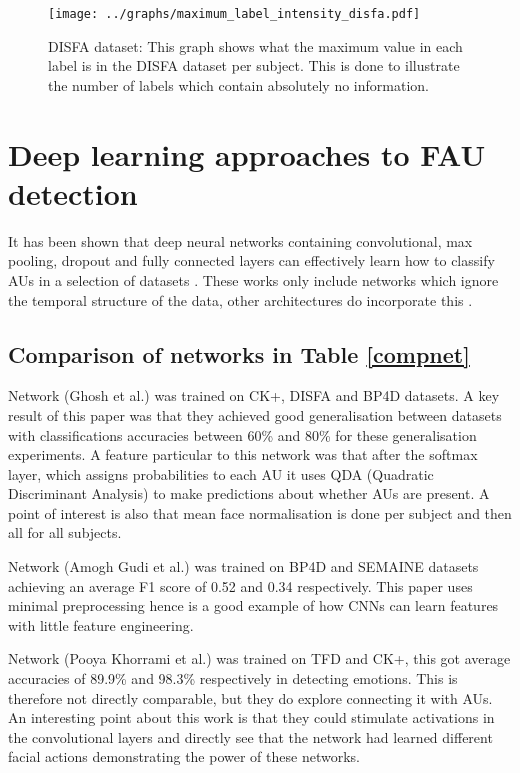 \documentclass[11pt,twoside]{report}
\begin{document}
\begin{figure}[h!]
  \texttt{[image: ../graphs/maximum\_label\_intensity\_disfa.pdf]}
  \caption{DISFA dataset: This graph shows what the maximum value in each label is in the DISFA dataset per subject. This
  is done to illustrate the number of labels which contain absolutely no information.}\label{disfastats}
\end{figure}
\newpage

\section{Deep learning approaches to FAU detection}
It has been shown that deep neural networks containing convolutional, max pooling,
dropout and fully connected layers can effectively learn how to classify AUs in
a selection of datasets \cite{Gudi2015,Ghosh2015,dodeeplearn}. These
works only include networks which ignore the temporal structure of the data,
other architectures do incorporate this \cite{emonet,Jaiswal2016}.


%
%
%






\subsection*{Comparison of networks in Table \ref{compnet}}
Network \cite{Ghosh2015} (Ghosh et al.) was trained on CK+, DISFA and BP4D datasets.
A key result of this paper was that they achieved good generalisation between datasets
with classifications accuracies between 60\% and 80\% for these generalisation experiments.
A feature particular to this network was that after the softmax layer, which assigns probabilities
to each AU it uses QDA (Quadratic Discriminant Analysis) \cite{precogbook} to
make predictions about whether AUs are present. A point of interest is also that
mean face normalisation is done per subject and then all for all subjects.

Network \cite{Gudi2015} (Amogh Gudi et al.) was trained on BP4D and SEMAINE
datasets achieving an average F1 score of 0.52 and 0.34 respectively. This paper
uses minimal preprocessing hence is a good example of how CNNs can learn features
with little feature engineering.

Network \cite{dodeeplearn} (Pooya Khorrami et al.) was trained on TFD and CK+,
this got average accuracies of 89.9\% and 98.3\% respectively in detecting emotions. This
is therefore not directly comparable, but they do explore connecting it with AUs.
An interesting point about this work is that they could stimulate activations in the convolutional
layers and directly see that the network had learned different facial actions demonstrating the
power of these networks.
\end{document}
